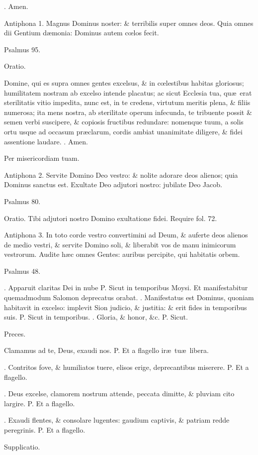 \documentclass[letter,11pt]{book}
\makeatletter
\DeclareRobustCommand{\Vbar}{\vers@resp{-0.1em}{V}}
\DeclareRobustCommand{\Rbar}{\vers@resp{0pt}{R}}
\newcommand{\vers@resp@sym}{\raisebox{0.2ex}{\rotatebox[origin=c]{-20}{$\m@th\rceil$}}}
\newcommand{\vers@resp}[2]{%
  {\ooalign{\hidewidth\kern#1\vers@resp@sym\hidewidth\cr#2\cr}}%
}%
\def\P{\color{Red} P. \color{black}}
\def\V{\color{Red} \Vbar . \color{black}}
\def\R{\color{Red} \Rbar . \color{black}}
\makeatother
\begin{document}
\begin{multicols*}{2}
\R Amen.

Antiphona 1. Magnus Dominus noster: \& terribilis super omnes deos. Quia omnes dii Gentium d\ae monia: Dominus autem c\oe los fecit.

Psalmus 95.

Oratio.

Domine, qui es supra omnes gentes excelsus, \& in c\oe lestibus habitas gloriosus; humilitatem nostram ab excelso intende placatus; ac sicut Ecclesia tua, qu\ae \ erat sterilitatis vitio impedita, nunc est, in te credens, virtutum meritis plena, \& filiis numerosa; ita mens nostra, ab sterilitate operum infecunda, te tribuente possit \& semen verbi suscipere, \& copiosis fructibus redundare: nomenque tuum, a solis ortu usque ad occasum pr\ae clarum, cordis ambiat unanimitate diligere, \& fidei assentione laudare.
\R Amen.

Per misericordiam tuam.

Antiphona 2. Servite Domino Deo vestro: \& nolite adorare deos alienos; quia Dominus sanctus est. Exultate Deo adjutori nostro: jubilate Deo Jacob.

Psalmus 80.

Oratio. Tibi adjutori nostro Domino exultatione fidei. Require fol. 72.

Antiphona 3. In toto corde vestro convertimini ad Deum, \& auferte deos alienos de medio vestri, \& servite Domino soli, \& liberabit vos de manu inimicorum vestrorum. Audite h\ae c omnes Gentes: auribus percipite, qui habitatis orbem.

Psalmus 48.

\R Apparuit claritas Dei in nube \P Sicut in temporibus Moysi. Et manifestabitur quemadmodum Salomon deprecatus orabat. \V Manifestatus est Dominus, quoniam habitavit in excelso: implevit Sion judicio, \& justitia: \& erit fides in temporibus suis. \P Sicut in temporibus. \V Gloria, \& honor, \&c. \P Sicut.

Preces.

Clamamus ad te, Deus, exaudi nos.
\P Et a flagello ir\ae \ tu\ae \ libera.

\V Contritos fove, \& humiliatos tuere, elisos erige, deprecantibus miserere.
\P Et a flagello.

\V Deus excelse, clamorem nostrum attende, peccata dimitte, \& pluviam cito largire.
\P Et a flagello.

\V Exaudi flentes, \& consolare lugentes: gaudium captivis, \& patriam redde peregrinis.
\P Et a flagello.

Supplicatio.


\end{multicols*}
\end{document}
